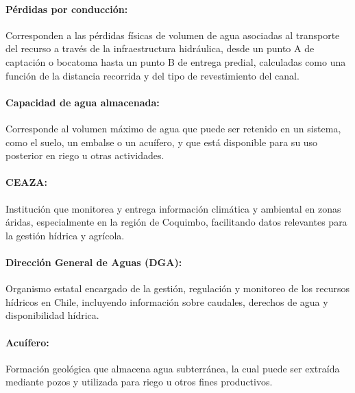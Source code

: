 \documentclass[12pt]{report}
\begin{document}
\paragraph{Pérdidas por conducción:} 
Corresponden a las pérdidas físicas de volumen de agua asociadas al transporte del recurso a través de la infraestructura hidráulica, desde un punto A de captación o bocatoma hasta un punto B de entrega predial, calculadas como una función de la distancia recorrida y del tipo de revestimiento del canal.

\vspace{0.2cm}

\paragraph{Capacidad de agua almacenada:} 
Corresponde al volumen máximo de agua que puede ser retenido en un sistema, como el suelo, un embalse o un acuífero, y que está disponible para su uso posterior en riego u otras actividades.

\vspace{0.2cm}

\paragraph{CEAZA:} 
Institución que monitorea y entrega información climática y ambiental en zonas áridas, especialmente en la región de Coquimbo, facilitando datos relevantes para la gestión hídrica y agrícola.

\vspace{0.2cm}

\paragraph{Dirección General de Aguas (DGA):} 
Organismo estatal encargado de la gestión, regulación y monitoreo de los recursos hídricos en Chile, incluyendo información sobre caudales, derechos de agua y disponibilidad hídrica.

\vspace{0.2cm}

\paragraph{Acuífero:} 
Formación geológica que almacena agua subterránea, la cual puede ser extraída mediante pozos y utilizada para riego u otros fines productivos.

\vspace{0.2cm}
\end{document}
